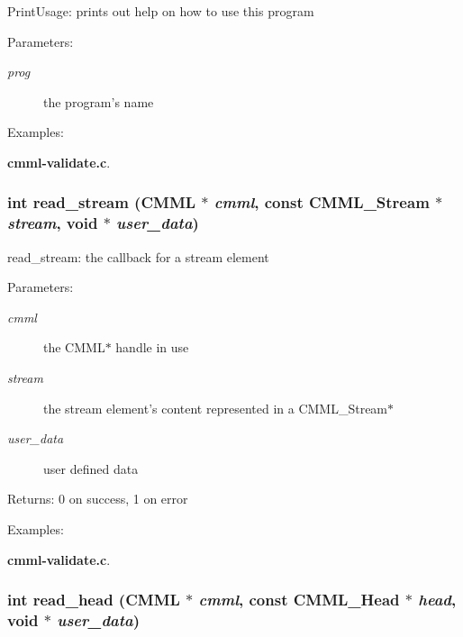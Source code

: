 Print\-Usage: prints out help on how to use this program

\begin{Desc}
\item[Parameters:]
\begin{description}
\item[{\em prog}]the program's name \end{description}
\end{Desc}
\begin{Desc}
\item[Examples: ]\par
{\bf cmml-validate.c}.\end{Desc}
\subsubsection{\setlength{\rightskip}{0pt plus 5cm}int read\_\-stream ({\bf CMML} $\ast$ {\em cmml}, const {\bf CMML\_\-Stream} $\ast$ {\em stream}, void $\ast$ {\em user\_\-data})\hspace{0.3cm}{\tt  [static]}}\label{cmml-validate_8c_a3}


read\_\-stream: the callback for a stream element

\begin{Desc}
\item[Parameters:]
\begin{description}
\item[{\em cmml}]the CMML$\ast$ handle in use \item[{\em stream}]the stream element's content represented in a CMML\_\-Stream$\ast$ \item[{\em user\_\-data}]user defined data\end{description}
\end{Desc}
\begin{Desc}
\item[Returns:]0 on success, 1 on error \end{Desc}
\begin{Desc}
\item[Examples: ]\par
{\bf cmml-validate.c}.\end{Desc}
\subsubsection{\setlength{\rightskip}{0pt plus 5cm}int read\_\-head ({\bf CMML} $\ast$ {\em cmml}, const {\bf CMML\_\-Head} $\ast$ {\em head}, void $\ast$ {\em user\_\-data})\hspace{0.3cm}{\tt  [static]}}\label{cmml-validate_8c_a4}


